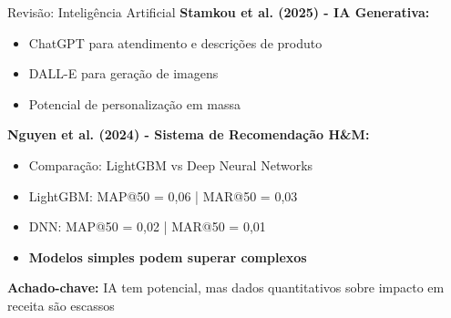 \documentclass{beamer}
\begin{document}
    \begin{frame}{Revisão: Inteligência Artificial}
        \textbf{Stamkou et al. (2025) - IA Generativa:}
        \begin{itemize}
            \item ChatGPT para atendimento e descrições de produto
            \item DALL-E para geração de imagens
            \item Potencial de personalização em massa
        \end{itemize}

        \vspace{0.3cm}

        \textbf{Nguyen et al. (2024) - Sistema de Recomendação H\&M:}
        \begin{itemize}
            \item Comparação: LightGBM vs Deep Neural Networks
            \item LightGBM: MAP@50 = 0,06 | MAR@50 = 0,03
            \item DNN: MAP@50 = 0,02 | MAR@50 = 0,01
            \item \textbf{Modelos simples podem superar complexos}
        \end{itemize}

        \vspace{0.3cm}

        \textbf{Achado-chave:} IA tem potencial, mas dados quantitativos sobre impacto em receita são escassos
    \end{frame}
\end{document}
